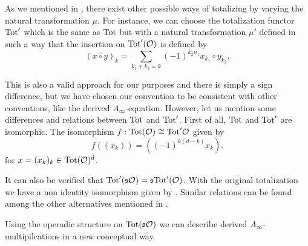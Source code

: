 \documentclass[join.tex]{subfiles}
\begin{document}
\begin{remark}\label{othermu}


As we mentioned in , there exist other possible ways of totalizing by varying the natural transformation $\mu$. For instance, we can choose the totalization functor $\mathrm{Tot}'$ which is the same as $\mathrm{Tot}$ but with a natural transformation $\mu'$ defined in such a way that the insertion on $\mathrm{Tot}'({\mathcal O})$ is defined by \[(x\hat{\circ}y)_k=\sum_{k_1+k_2=k}(-1)^{k_2n_1}x_{k_1}\circ y_{k_2}.\] 

This is also a valid approach for our purposes and there is simply a sign difference, but we have chosen our convention to be consistent with other conventions, like the derived $A_\infty$-equation. However, let us mention some differences and relations between $\mathrm{Tot}$ and $\mathrm{Tot}'$. %
First of all, $\mathrm{Tot}$ and $\mathrm{Tot}'$ are isomorphic. The isomorphism $f:\mathrm{Tot}({\mathcal O})\cong \mathrm{Tot}'{\mathcal O}$ given by \[f((x_k))=((-1)^{k(d-k)}x_k).\]
for $x=(x_k)_k\in\mathrm{Tot}({\mathcal O})^d$. %

It can also be verified that $\mathrm{Tot}'(\mathfrak{s}{\mathcal O})=\mathfrak{s} \mathrm{Tot}'({\mathcal O})$. With the original totalization we have a non identity isomorphism given by . Similar relations can be found among the other alternatives mentioned in . %



\end{remark}


Using the operadic structure on $\mathrm{Tot}(\mathfrak{s}{\mathcal O})$ we can describe derived $A_\infty$-multipilcations in a new conceptual way.
\end{document}
